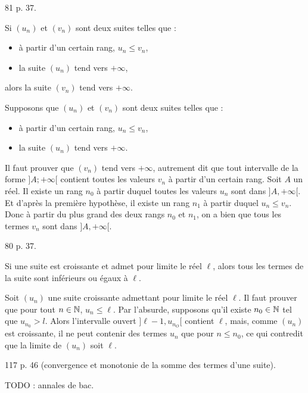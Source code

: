 \documentclass[a4paper,11pt,DIV20,BCOR0mm]{scrartcl}
\begin{document}
\begin{exercice}
 81 p. 37.
\end{exercice}

\begin{theoreme}
 Si $(u_n)$ et $(v_n)$ sont deux suites telles que :
\begin{itemize}
  \item à partir d'un certain rang, $u_n\leq v_n$,
  \item la suite $(u_n)$ tend vers $+\infty$,
\end{itemize}
alors la suite $(v_n)$ tend vers $+\infty$.
\end{theoreme}

\begin{demonstration}
 Supposons que $(u_n)$ et $(v_n)$ sont deux suites telles que :
\begin{itemize}
  \item à partir d'un certain rang, $u_n\leq v_n$,
  \item la suite $(u_n)$ tend vers $+\infty$.
\end{itemize}
Il faut prouver que $(v_n)$ tend vers $+\infty$, autrement dit que
tout intervalle de la forme $]A;+\infty[$ contient toutes les valeurs $v_n$ à partir d'un certain rang.
Soit $A$ un réel. Il existe un rang $n_0$ à partir duquel toutes les valeurs $u_n$ sont dans $]A,+\infty[$.
Et d'après la première hypothèse, il existe un rang $n_1$ à partir duquel $u_n\leq v_n$. Donc à partir 
du plus grand des deux rangs $n_0$ et $n_1$, on a bien que tous les termes $v_n$ sont dans $]A,+\infty[$.
\end{demonstration}

\begin{exercice}
 80 p. 37.
\end{exercice}



\begin{theoreme}
 Si une suite est croissante et admet pour limite le réel $\ell$, alors tous les termes de la suite sont inférieurs ou égaux à $\ell$.
\end{theoreme}

\begin{demonstration}
 Soit $(u_n)$ une suite croissante admettant pour limite le réel $\ell$. Il faut prouver que pour tout $n\in\mathbb{N}$, $u_n\leq \ell$.
Par l'absurde, supposons qu'il existe $n_0\in\mathbb{N}$ tel que $u_{n_0}>l$. Alors l'intervalle ouvert $]\ell-1,u_{n_O}[$ contient $\ell$,
mais, comme $(u_n)$ est croissante, il ne peut contenir des termes $u_n$ que pour $n\leq n_0$, ce qui contredit que la limite de $(u_n)$
soit $\ell$.
\end{demonstration}

\begin{exercice}
 117 p. 46 (convergence et monotonie de la somme des termes d'une suite). 
\end{exercice}

TODO : annales de bac.
\end{document}
